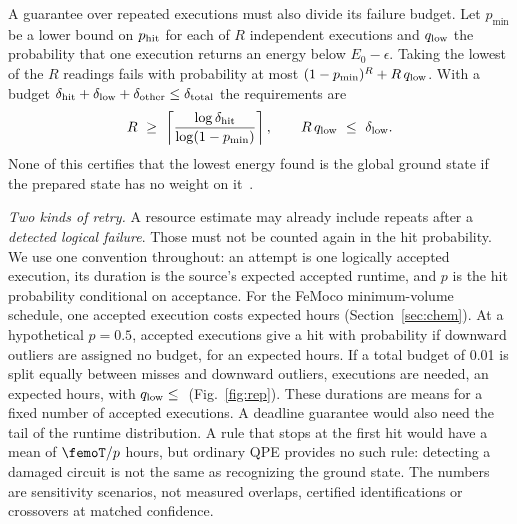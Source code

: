 A guarantee over repeated executions must also divide its failure budget. Let $p_{\min}$ be a lower bound on $p_{\rm hit}$ for each of $R$ independent executions and $q_{\rm low}$ the probability that one execution returns an energy below $E_0-\epsilon$. Taking the lowest of the $R$ readings fails with probability at most $(1-p_{\min})^R+R\,q_{\rm low}$. With a budget $\delta_{\rm hit}+\delta_{\rm low}+\delta_{\rm other}\le\delta_{\rm total}$ the requirements are
\begin{equation}
R\ \ge\ \left\lceil\frac{\log\delta_{\rm hit}}{\log(1-p_{\min})}\right\rceil,\qquad R\,q_{\rm low}\ \le\ \delta_{\rm low}.
\label{eq:qperep}
\end{equation}
None of this certifies that the lowest energy found is the global ground state if the prepared state has no weight on it~\cite{berry2024}.



\emph{Two kinds of retry.} A resource estimate may already include repeats after a \emph{detected logical failure}. Those must not be counted again in the hit probability. We use one convention throughout: an attempt is one logically accepted execution, its duration is the source's expected accepted runtime, and $p$ is the hit probability conditional on acceptance. For the FeMoco minimum-volume schedule, one accepted execution costs \femoT{} expected hours (Section~\ref{sec:chem}). At a hypothetical $p=0.5$, \repAttempts{} accepted executions give a hit with probability \repHit{} if downward outliers are assigned no budget, for an expected \repHours{} hours. If a total budget of 0.01 is split equally between misses and downward outliers, \repAttemptsSplit{} executions are needed, an expected \repHoursSplit{} hours, with $q_{\rm low}\le{}$\repQlow{} (Fig.~\ref{fig:rep}). These durations are means for a fixed number of accepted executions. A deadline guarantee would also need the tail of the runtime distribution. A rule that stops at the first hit would have a mean of $\femoT/p$ hours, but ordinary QPE provides no such rule: detecting a damaged circuit is not the same as recognizing the ground state. The numbers are sensitivity scenarios, not measured overlaps, certified identifications or crossovers at matched confidence.

